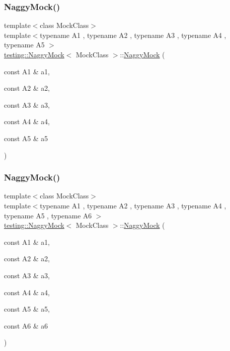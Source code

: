 \mbox{\label{classtesting_1_1_naggy_mock_ac751c8a708935bd8558c9665160f7144}} 
\subsubsection{\texorpdfstring{Naggy\+Mock()}{NaggyMock()}\hspace{0.1cm}{\footnotesize\ttfamily [6/11]}}
{\footnotesize\ttfamily template$<$class Mock\+Class$>$ \\
template$<$typename A1 , typename A2 , typename A3 , typename A4 , typename A5 $>$ \\
\hyperlink{classtesting_1_1_naggy_mock}{testing\+::\+Naggy\+Mock}$<$ Mock\+Class $>$\+::\hyperlink{classtesting_1_1_naggy_mock}{Naggy\+Mock} (\begin{DoxyParamCaption}\item[{const A1 \&}]{a1,  }\item[{const A2 \&}]{a2,  }\item[{const A3 \&}]{a3,  }\item[{const A4 \&}]{a4,  }\item[{const A5 \&}]{a5 }\end{DoxyParamCaption})\hspace{0.3cm}{\ttfamily [inline]}}

\mbox{\label{classtesting_1_1_naggy_mock_aac4c0986e917a5d6e515f8dc0e7bf644}} 
\subsubsection{\texorpdfstring{Naggy\+Mock()}{NaggyMock()}\hspace{0.1cm}{\footnotesize\ttfamily [7/11]}}
{\footnotesize\ttfamily template$<$class Mock\+Class$>$ \\
template$<$typename A1 , typename A2 , typename A3 , typename A4 , typename A5 , typename A6 $>$ \\
\hyperlink{classtesting_1_1_naggy_mock}{testing\+::\+Naggy\+Mock}$<$ Mock\+Class $>$\+::\hyperlink{classtesting_1_1_naggy_mock}{Naggy\+Mock} (\begin{DoxyParamCaption}\item[{const A1 \&}]{a1,  }\item[{const A2 \&}]{a2,  }\item[{const A3 \&}]{a3,  }\item[{const A4 \&}]{a4,  }\item[{const A5 \&}]{a5,  }\item[{const A6 \&}]{a6 }\end{DoxyParamCaption})\hspace{0.3cm}{\ttfamily [inline]}}

